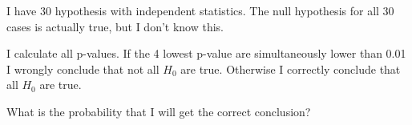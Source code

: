 
\begin{question}
I have 30 hypothesis with independent statistics. The null hypothesis for all 30
cases is actually true, but I don't know this.

I calculate all p-values.
If the 4 lowest p-value are simultaneously lower than 0.01 I wrongly conclude that not all \(H_0\) are true. Otherwise I correctly conclude that all \(H_0\) are true.

What is the probability that I will get the correct conclusion?
\end{question}


